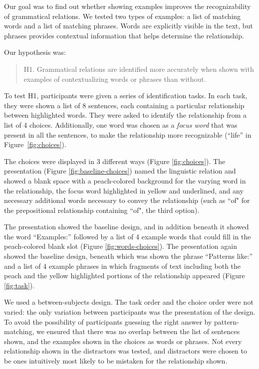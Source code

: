 

Our goal was to find out whether showing examples improves the recognizability of grammatical relations. We tested two types of examples: a list of matching words and a list of matching phrases. Words are explicitly visible in the text, but phrases provides contextual information that helps determine the relationship.

Our hypothesis was:
\begin{quote}
	H1. Grammatical relations are identified more accurately when shown with examples of contextualizing words or phrases than without.
\end{quote}

To test H1, participants were given a series of identification tasks. In each task, they were shown a list of 8 sentences, each containing a particular relationship between highlighted words. They were asked to identify the relationship from a list of 4 choices.  Additionally, one word was chosen as a \emph{focus word} that was present in all the sentences, to make the relationship more recognizable (``life'' in Figure~\ref{fig:choices}).

The choices were displayed in 3 different ways (Figure \ref{fig:choices}).  The  presentation
(Figure \ref{fig:baseline-choices}) named the linguistic relation and showed a blank space with a peach-colored background for the varying word in the relationship, the focus word highlighted in yellow and underlined, and any necessary additional words necessary to convey the relationship (such as ``of" for the prepositional relationship containing ``of",  the third option).

The  presentation showed the baseline design, and in addition beneath it showed the word ``Examples:'' followed by a list of 4 example words that could fill in the peach-colored blank slot (Figure \ref{fig:words-choices}).   The  presentation again showed the baseline design, beneath which was shown the phrase ``Patterns like:'' and a list of 4 example phrases in which fragments of text including both the peach and the yellow highlighted portions of the  relationship appeared (Figure \ref{fig:task}).

We used a between-subjects design. The task order and the choice order were not varied: the only variation between participants was the presentation of the design. To avoid the possibility of participants guessing the right answer by pattern-matching, we ensured that there was no overlap between the list of sentences shown, and the examples shown in the choices as words or phrases. Not every relationship shown in the distractors was tested, and distractors were chosen to be ones intuitively most likely to be mistaken for  the relationship shown.

